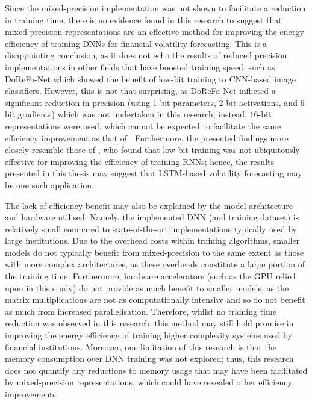 \documentclass[a4paper, 11pt]{report}
\begin{document}
    Since the mixed-precision implementation was not shown to facilitate a reduction in training time, there is no evidence found in this research to suggest that mixed-precision representations are an effective method for improving the energy efficiency of training DNNs for financial volatility forecasting. This is a disappointing conclusion, as it does not echo the results of reduced precision implementations in other fields that have boosted training speed, such as DoReFa-Net \citep{zhou-2016} which showed the benefit of low-bit training to CNN-based image classifiers. However, this is not that surprising, as DoReFa-Net inflicted a significant reduction in precision (using 1-bit parameters, 2-bit activations, and 6-bit gradients) which was not undertaken in this research; instead, $16$-bit representations were used, which cannot be expected to facilitate the same efficiency improvement as that of \citet{zhou-2016}. Furthermore, the presented findings more closely resemble those of \citet{ott-2017}, who found that low-bit training was not ubiquitously effective for improving the efficiency of training RNNs; hence, the results presented in this thesis may suggest that LSTM-based volatility forecasting may be one such application.

    The lack of efficiency benefit may also be explained by the model architecture and hardware utilised. Namely, the implemented DNN (and training dataset) is relatively small compared to state-of-the-art implementations typically used by large institutions. Due to the overhead costs within training algorithms, smaller models do not typically benefit from mixed-precision to the same extent as those with more complex architectures, as these overheads constitute a large portion of the training time. Furthermore, hardware accelerators (such as the GPU relied upon in this study) do not provide as much benefit to smaller models, as the matrix multiplications are not as computationally intensive and so do not benefit as much from increased parallelisation. Therefore, whilst no training time reduction was observed in this research, this method may still hold promise in improving the energy efficiency of training higher complexity systems used by financial institutions. Moreover, one limitation of this research is that the memory consumption over DNN training was not explored; thus, this research does not quantify any reductions to memory usage that may have been facilitated by mixed-precision representations, which could have revealed other efficiency improvements.
\end{document}
